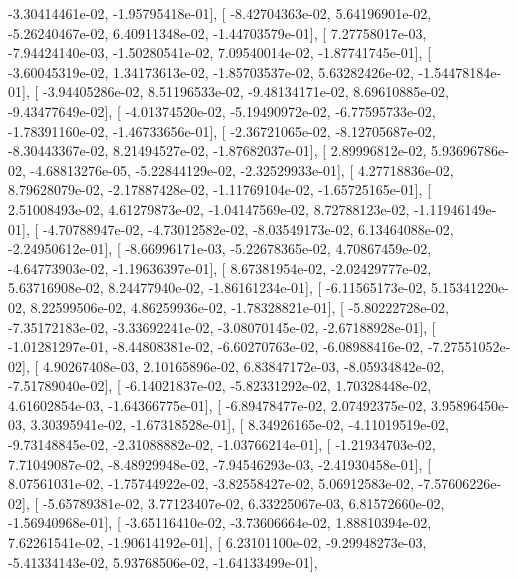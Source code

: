 \documentclass{article}
\begin{document}
         -3.30414461e-02,  -1.95795418e-01],
       [ -8.42704363e-02,   5.64196901e-02,  -5.26240467e-02,
          6.40911348e-02,  -1.44703579e-01],
       [  7.27758017e-03,  -7.94424140e-03,  -1.50280541e-02,
          7.09540014e-02,  -1.87741745e-01],
       [ -3.60045319e-02,   1.34173613e-02,  -1.85703537e-02,
          5.63282426e-02,  -1.54478184e-01],
       [ -3.94405286e-02,   8.51196533e-02,  -9.48134171e-02,
          8.69610885e-02,  -9.43477649e-02],
       [ -4.01374520e-02,  -5.19490972e-02,  -6.77595733e-02,
         -1.78391160e-02,  -1.46733656e-01],
       [ -2.36721065e-02,  -8.12705687e-02,  -8.30443367e-02,
          8.21494527e-02,  -1.87682037e-01],
       [  2.89996812e-02,   5.93696786e-02,  -4.68813276e-05,
         -5.22844129e-02,  -2.32529933e-01],
       [  4.27718836e-02,   8.79628079e-02,  -2.17887428e-02,
         -1.11769104e-02,  -1.65725165e-01],
       [  2.51008493e-02,   4.61279873e-02,  -1.04147569e-02,
          8.72788123e-02,  -1.11946149e-01],
       [ -4.70788947e-02,  -4.73012582e-02,  -8.03549173e-02,
          6.13464088e-02,  -2.24950612e-01],
       [ -8.66996171e-03,  -5.22678365e-02,   4.70867459e-02,
         -4.64773903e-02,  -1.19636397e-01],
       [  8.67381954e-02,  -2.02429777e-02,   5.63716908e-02,
          8.24477940e-02,  -1.86161234e-01],
       [ -6.11565173e-02,   5.15341220e-02,   8.22599506e-02,
          4.86259936e-02,  -1.78328821e-01],
       [ -5.80222728e-02,  -7.35172183e-02,  -3.33692241e-02,
         -3.08070145e-02,  -2.67188928e-01],
       [ -1.01281297e-01,  -8.44808381e-02,  -6.60270763e-02,
         -6.08988416e-02,  -7.27551052e-02],
       [  4.90267408e-03,   2.10165896e-02,   6.83847172e-03,
         -8.05934842e-02,  -7.51789040e-02],
       [ -6.14021837e-02,  -5.82331292e-02,   1.70328448e-02,
          4.61602854e-03,  -1.64366775e-01],
       [ -6.89478477e-02,   2.07492375e-02,   3.95896450e-03,
          3.30395941e-02,  -1.67318528e-01],
       [  8.34926165e-02,  -4.11019519e-02,  -9.73148845e-02,
         -2.31088882e-02,  -1.03766214e-01],
       [ -1.21934703e-02,   7.71049087e-02,  -8.48929948e-02,
         -7.94546293e-03,  -2.41930458e-01],
       [  8.07561031e-02,  -1.75744922e-02,  -3.82558427e-02,
          5.06912583e-02,  -7.57606226e-02],
       [ -5.65789381e-02,   3.77123407e-02,   6.33225067e-03,
          6.81572660e-02,  -1.56940968e-01],
       [ -3.65116410e-02,  -3.73606664e-02,   1.88810394e-02,
          7.62261541e-02,  -1.90614192e-01],
       [  6.23101100e-02,  -9.29948273e-03,  -5.41334143e-02,
          5.93768506e-02,  -1.64133499e-01],
\end{document}
